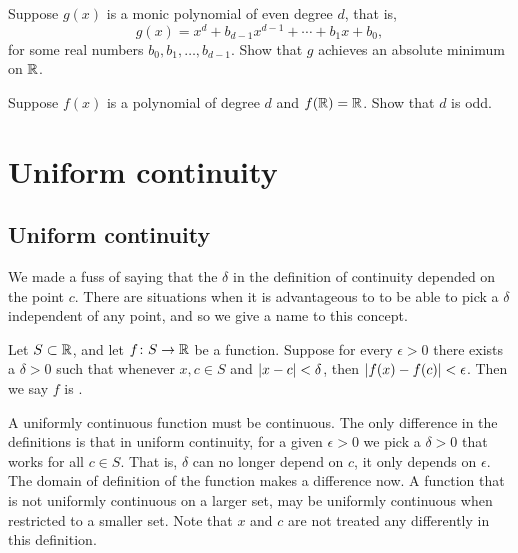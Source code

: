 \begin{exercise}
Suppose $g(x)$ is a monic polynomial of even degree $d$, that is,
\begin{equation*}
g(x) = x^d + b_{d-1} x^{d-1} + \cdots + b_1 x + b_0 ,
\end{equation*}
for some real numbers $b_{0}, b_1, \ldots, b_{d-1}$.
Show that $g$ achieves an absolute minimum on ${\mathbb{R}}$.
\end{exercise}

\begin{exercise}
Suppose $f(x)$ is a polynomial of degree $d$ and 
$f({\mathbb{R}}) = {\mathbb{R}}$.  Show that $d$ is odd.
\end{exercise}


\sectionnewpage
\section{Uniform continuity}
\label{sec:unifcont}


\subsection{Uniform continuity}

We made a fuss of saying that the $\delta$ in the definition of
continuity depended on the point $c$.  There are situations when it is
advantageous to to be able to pick a $\delta$ independent of any point, and so we
give a name to this concept.

\begin{defn}
Let $S \subset {\mathbb{R}}$, and let $f \colon S \to {\mathbb{R}}$ be a function.
Suppose for every $\epsilon > 0$ there exists a $\delta > 0$
such that whenever $x, c \in S$ and
$\left\lvert {x-c} \right\rvert < \delta$, then $\left\lvert {f(x)-f(c)} \right\rvert < \epsilon$.
Then we say $f$ is \emph{}.
\end{defn}

A uniformly continuous function must be continuous.
The only difference in the definitions
is that in uniform continuity,
for a given $\epsilon > 0$ we pick a $\delta > 0$ that
works for all $c \in S$.  That is, $\delta$ can no longer depend on $c$,
it only depends on $\epsilon$.  The domain of definition
of the function makes a difference now.  A function that is not uniformly
continuous on a larger set, may be uniformly continuous when restricted to a
smaller set.
Note that $x$ and $c$ are not treated any differently
in this definition.

